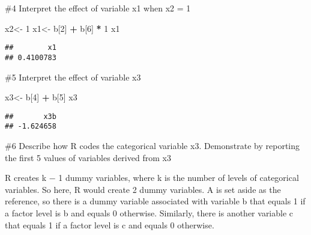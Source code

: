 \documentclass[
]{article}
\newenvironment{Shaded}{\begin{snugshade}}{\end{snugshade}}
\newcommand{\DecValTok}[1]{\textcolor[rgb]{0.00,0.00,0.81}{#1}}
\newcommand{\KeywordTok}[1]{\textcolor[rgb]{0.13,0.29,0.53}{\textbf{#1}}}
\newcommand{\NormalTok}[1]{#1}
\newcommand{\OperatorTok}[1]{\textcolor[rgb]{0.81,0.36,0.00}{\textbf{#1}}}
\newcommand{\StringTok}[1]{\textcolor[rgb]{0.31,0.60,0.02}{#1}}
\begin{document}
\#4 Interpret the effect of variable x1 when x2 = 1

\begin{Shaded}
\begin{Highlighting}[]
\NormalTok{x2<-}\StringTok{ }\DecValTok{1}
\NormalTok{x1<-}\StringTok{ }\NormalTok{b[}\DecValTok{2}\NormalTok{] }\OperatorTok{+}\StringTok{ }\NormalTok{b[}\DecValTok{6}\NormalTok{] }\OperatorTok{*}\StringTok{ }\DecValTok{1}
\NormalTok{x1}
\end{Highlighting}
\end{Shaded}

\begin{verbatim}
##        x1 
## 0.4100783
\end{verbatim}

\#5 Interpret the effect of variable x3

\begin{Shaded}
\begin{Highlighting}[]
\NormalTok{x3<-}\StringTok{ }\NormalTok{b[}\DecValTok{4}\NormalTok{] }\OperatorTok{+}\StringTok{ }\NormalTok{b[}\DecValTok{5}\NormalTok{]}
\NormalTok{x3}
\end{Highlighting}
\end{Shaded}

\begin{verbatim}
##       x3b 
## -1.624658
\end{verbatim}

\#6 Describe how R codes the categorical variable x3. Demonstrate by
reporting the first 5 values of variables derived from x3

R creates k − 1 dummy variables, where k is the number of levels of
categorical variables. So here, R would create 2 dummy variables. A is
set aside as the reference, so there is a dummy variable associated with
variable b that equals 1 if a factor level is b and equals 0 otherwise.
Similarly, there is another variable c that equals 1 if a factor level
is c and equals 0 otherwise.

\begin{Shaded}
\end{Shaded}
\end{document}
